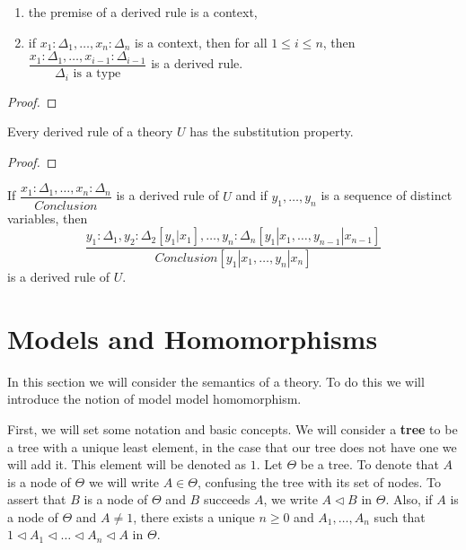 \begin{lemma}
    \begin{enumerate}
        \item the premise of a derived rule is a context,
        \item if $x_1 : \Delta_1, \dots, x_n : \Delta_n$ is a context,
            then for all $1 \leq i \leq n$, then \\ 
            $\dfrac{x_1 : \Delta_1, \dots, x_{i-1} : \Delta_{i-1}}{\Delta_i \text{ is a type}}$
            is a derived rule.
    \end{enumerate}
\end{lemma}
\begin{proof}
\end{proof}

\begin{lemma}
    Every derived rule of a theory $U$ has the substitution property.
\end{lemma}
\begin{proof}
\end{proof}

\begin{corollary}
    If $\dfrac{x_1 : \Delta_1, \dots, x_n : \Delta_n}{Conclusion}$
    is a derived rule of $U$ and if $y_1, \dots, y_n$ is a sequence of distinct variables,
    then
    \begin{equation*}
        \dfrac{
            y_1 : \Delta_1, y_2 : \Delta_2[y_1 | x_1], \dots, y_n : \Delta_n[y_1 | x_1, \dots, y_{n-1} | x_{n-1}]
        }{
            Conclusion[y_1 | x_1, \dots, y_n | x_n]
        }
    \end{equation*}
    is a derived rule of $U$.
\end{corollary}

\section{Models and Homomorphisms}

In this section we will consider the semantics of a theory.
To do this we will introduce the notion of model model
homomorphism.

First, we will set some notation and basic concepts. 
We will consider a \textbf{tree} to be a tree with a unique
least element, in the case that our tree does not have one
we will add it. This element will be denoted as $1$.
Let $\Theta$ be a tree. To denote that $A$ is a node of 
$\Theta$ we will write $A \in \Theta$, confusing the 
tree with its set of nodes. To assert that
$B$ is a node of $\Theta$ and $B$ succeeds $A$, we 
write $A \vartriangleleft B$ in $\Theta$.
Also, if $A$ is a node of $\Theta$ and $A \neq 1$,
there exists a unique $n \geq 0$ and $A_1, \dots, A_n$
such that $1 \vartriangleleft A_1 \vartriangleleft \dots \vartriangleleft A_n \vartriangleleft A$ in $\Theta$.

